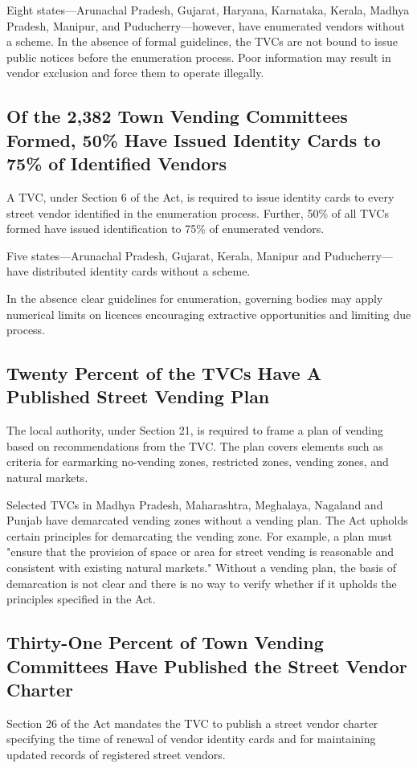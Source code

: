 \documentclass[a4paper, 12pt, twoside]{article}
\begin{document}
	Eight states—Arunachal Pradesh, Gujarat, Haryana, Karnataka, Kerala, Madhya Pradesh, Manipur, and Puducherry—however, have enumerated vendors without a scheme. In the absence of formal guidelines, the TVCs are not bound to issue public notices before the enumeration process. Poor information may result in vendor exclusion and force them to operate illegally.

\subsection{Of the 2,382 Town Vending Committees Formed, 50\% Have Issued Identity Cards to 75\% of Identified Vendors}
	A TVC, under Section 6 of the Act, is required to issue identity cards to every street vendor identified in the enumeration process.  Further, 50\% of all TVCs formed have issued identification to 75\% of enumerated vendors.

	Five states—Arunachal Pradesh, Gujarat, Kerala, Manipur and Puducherry—have distributed identity cards without a scheme. 

	In the absence clear guidelines for enumeration, governing bodies may apply numerical limits on licences encouraging extractive opportunities and limiting due process.

\subsection{Twenty Percent of the TVCs Have A Published Street Vending Plan}
	The local authority, under Section 21, is required to frame a plan of vending based on recommendations from the TVC. The plan covers elements such as criteria for earmarking no-vending zones, restricted zones, vending zones, and natural markets.

	Selected TVCs in Madhya Pradesh, Maharashtra, Meghalaya, Nagaland and Punjab have demarcated vending zones without a vending plan. The Act upholds certain principles for demarcating the vending zone. For example, a plan must "ensure that the provision of space or area for street vending is reasonable and consistent with existing natural markets." Without a vending plan, the basis of demarcation is not clear and there is no way to verify whether if it upholds the principles specified in the Act.

\subsection{Thirty-One Percent of Town Vending Committees Have Published the Street Vendor Charter}
	Section 26 of the Act mandates the TVC to publish a street vendor charter specifying the time of renewal of vendor identity cards and for maintaining updated records of registered street vendors.
\end{document}
